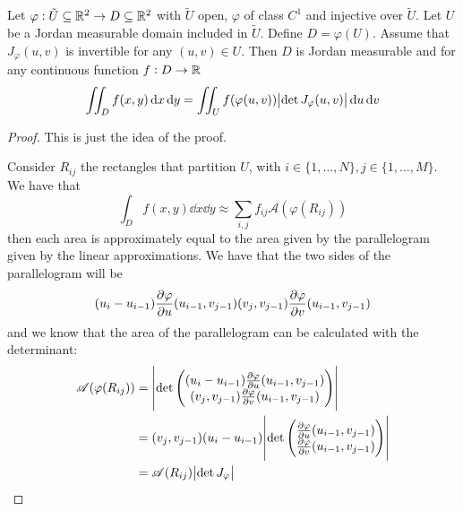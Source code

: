 \documentclass[12pt]{extarticle}
\begin{document}
\begin{theorem}
    Let $\varphi: \tilde{U} \subseteq \mathbb{R}^2 \to D \subseteq \mathbb{R}^2$ with $\tilde{U}$ open, $\varphi$ of class $C^1$ and injective over $\tilde{U}$.
    Let $U$ be a Jordan measurable domain included in $\tilde{U}$.
    Define $D = \varphi(U)$.
    Assume that $J_\varphi (u,v)$ is invertible for any $(u, v) \in U$.
    Then $D$ is Jordan measurable and for any continuous function $f:D \to \mathbb{R}$
    \begin{equation}
        \iint_D f(x, y) \dd{x}\dd{y} = \iint_U f(\varphi(u, v)) \abs{\det J_{\varphi}(u, v)} \dd{u} \dd{v}
    \end{equation}
\end{theorem}
\begin{proof}
    This is just the idea of the proof.

    Consider $R_{ij}$ the rectangles that partition $U$, with $i \in \{1, \ldots,N\}, j \in \{1, \ldots,M\}$.
    We have that
    \begin{equation}
        \int_D f(x, y) \dd{x} \dd{y} \approx \sum_{i,j} f_{ij} \mathscr A (\varphi(R_{ij}))
    \end{equation}
    then each area is approximately equal to the area given by the parallelogram given by the linear approximations.
    We have that the two sides of the parallelogram will be
    \begin{gather}
        (u_i - u_{i-1}) \pdv{\varphi}{u}()(u_{i-1}, v_{j-1})
        (v_j, v_{j-1}) \pdv{\varphi}{v}()(u_{i-1}, v_{j-1}) \\
    \end{gather}
    and we know that the area of the parallelogram can be calculated with the determinant:
    \begin{align}
        \mathscr A(\varphi(R_{ij})) & = \abs{\det \begin{pmatrix}
                                                          (u_i - u_{i-1}) \pdv{\varphi}{u}()(u_{i-1}, v_{j-1}) \\
                                                          (v_j, v_{j-1}) \pdv{\varphi}{v}()(u_{i-1}, v_{j-1})
                                                      \end{pmatrix}}               \\
                                    & = (v_j, v_{j-1})(u_i - u_{i-1}) \abs{\det \begin{pmatrix}
                                                                                        \pdv{\varphi}{u}()(u_{i-1}, v_{j-1}) \\
                                                                                        \pdv{\varphi}{v}()(u_{i-1}, v_{j-1})
                                                                                    \end{pmatrix}} \\
                                    & = \mathscr A(R_{ij}) \abs{\det J_\varphi}
    \end{align}


\end{proof}
\end{document}
